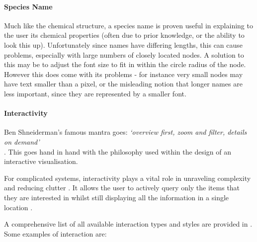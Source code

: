 \paragraph*{\color{c2}Species Name}

Much like the chemical structure, a species name is proven useful in explaining to the user its chemical properties (often due to prior knowledge, or the ability to look this up). Unfortunately since names have differing lengths, this can cause problems, especially with large numbers of closely located nodes. A solution to this may be to adjust the font size to fit in within the circle radius of the node. However this does come with its problems - for instance very small nodes may have text smaller than a pixel, or the misleading notion that longer names are less important, since they are represented by a smaller font. 


\paragraph*{\color{c3}Interactivity}

Ben Shneiderman's famous mantra goes: \emph{`overview first, zoom and filter, details on demand'} \\ \cite{mantra}. This goes hand in hand with the philosophy used within the design of an interactive visualisation.

For complicated systems, interactivity plays a vital role in unraveling complexity and reducing clutter \cite{interaction1}. It allows the user to actively query only the items that they are interested in whilst still displaying all the information in a single location \cite{oneplace}. 

A comprehensive list of all available interaction types and styles are provided in \cite{ch6}. Some examples of interaction are:\\ 

